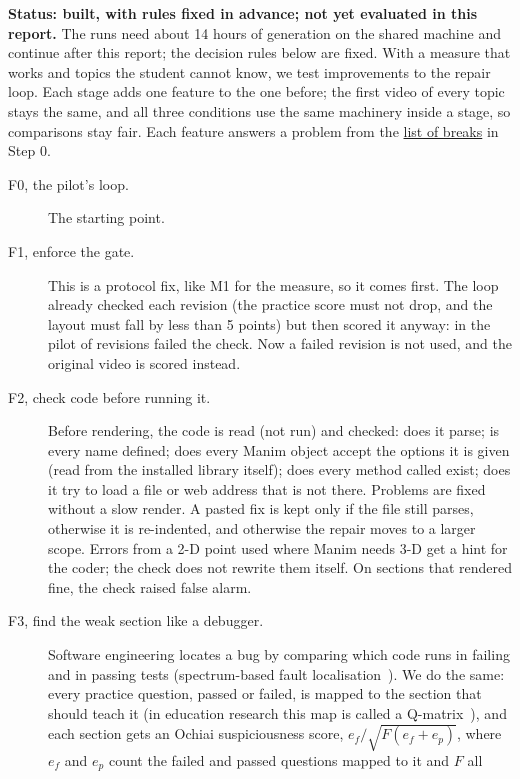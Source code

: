 \documentclass[11pt]{article}
\begin{document}
\textbf{Status: built, with rules fixed in advance; not yet evaluated in this report.} The runs need about 14 hours of
generation on the shared machine and continue after this report; the decision rules below are fixed. With a measure
that works and topics the student cannot know, we test improvements to the repair loop. Each stage
adds one feature to the one before; the first video of every topic stays the same, and all
three conditions use the same machinery inside a stage, so comparisons stay fair. Each feature answers a problem from the
\hyperref[sec:breaks]{list of breaks} in Step 0.

\begin{description}
  \item[F0, the pilot's loop.] The starting point.
  \item[F1, enforce the gate.] This is a protocol fix, like M1 for the measure, so it comes first. The loop already
  checked each revision (the practice score must not drop, and the layout must fall by less than 5 points) but then
  scored it anyway: in the pilot \PilotNotKept{} of \PilotRevisions{} revisions failed the
  check. Now a failed revision is not used, and the original video is scored instead.
  \item[F2, check code before running it.] Before rendering, the code is read (not run) and checked: does it parse;
  is every name defined; does every Manim object accept the options it is given (read from the installed library
  itself); does every method called exist; does it try to load a file or web address that is not there. Problems are
  fixed without a slow render. A pasted fix is kept only if the file still parses, otherwise it is re-indented, and
  otherwise the repair moves to a larger scope. Errors from a 2-D point used where Manim needs 3-D get a hint for the
  coder; the check does not rewrite them itself. On \PreflightN{} sections that rendered fine, the check raised
  \PreflightFP{} false alarm.
  \item[F3, find the weak section like a debugger.] Software engineering locates a bug by comparing which code runs
  in failing and in passing tests (spectrum-based fault localisation~\cite{tarantula,ochiai}). We do the same: every
  practice question, passed or failed, is mapped to the section that should teach it (in education research this map
  is called a Q-matrix~\cite{tatsuoka1983}), and each section gets an Ochiai suspiciousness score,
  $e_f / \sqrt{F(e_f + e_p)}$, where $e_f$ and $e_p$ count the failed and passed questions mapped to it and $F$ all

\end{description}
\end{document}
